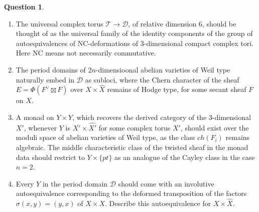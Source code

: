 \documentclass[12pt]{amsart}
\newcommand{\hide}[1]{}
\numberwithin{equation}{subsection}
\theoremstyle{plain}
\theoremstyle{definition}
\newtheorem{question}[thm]{Question}
\newcommand{\D}{{\mathcal D}}
\newcommand{\LB}{{\mathcal L}}
\newcommand{\T}{{\mathcal T}}
\renewcommand{\P}{{\mathcal P}}
\newcommand{\StructureSheaf}[1]{{\mathcal O}_{#1}}
\begin{document}
{\begin{question}
\begin{enumerate}
Algebraically, the fact that the pairing $(\bullet,\bullet)_V$ remains of Hodge type is encoded by the line bundle $\LB$ over $Y\times Y$, which is the pullback of the Poincar\'{e} line bundle over $Y\times \hat{Y}$ via the isomorphism $Y\cong \hat{Y}$ induced by $(\bullet,\bullet)_V.$
\item
The universal complex torus $\T\rightarrow \D$, of relative dimension $6$,  should be thought of as the universal family of the identity components of the group of autoequivalences of NC-deformations of $3$-dimensional compact complex tori. Here NC means not necessarily commutative.
\item
The period domains of $2n$-dimensioonal abelian varieties of Weil type naturally embed in $\D$ as subloci, where the Chern character of the sheaf $E=\Phi(F^\vee\boxtimes F)$ over $X\times \hat{X}$ remains of Hodge type, for some secant sheaf $F$ on $X$.
\item
A monad on $Y\times Y$, which recovers the derived category of the $3$-dimensional $X'$, whenever $Y$ is $X'\times\hat{X'}$ for some complex torus $X'$, should exist over the moduli space of abelian varieties of Weil type, as the class $ch(F_i)$ remains algebraic. 
The middle characteristic class of the twisted sheaf  in the monad data should restrict to $Y\times\{pt\}$ as an analogue of the Cayley class in the case $n=2$. 
\hide{
\item
For a general (non-commutative) formal deformation $X'$ of $X$ there should be an object $\StructureSheaf{\Delta_{X'}}$
in $D^b(X'\times X')$ which is the Fourier-Mukai kernel of the identity. So over a general gerby complex torus $Y$ in the period domain $\D$, there should be an object which is the image of $\StructureSheaf{\Delta_{X'}}$ via the equivalence $\Phi':D^b(X'\times X')\rightarrow D^b(Y)$ deforming Orlov's equivalence $\Phi:D^b(X\times X)\rightarrow D^b(X\times\hat{X})$.
ndeed, $\mu^*(\StructureSheaf{\Delta_{X}})\cong \mu^{-1}_*(\StructureSheaf{\Delta_{X}})$. Now $\mu^{-1}(\Delta_X)=\{0\}\times X$. So $\Phi(\StructureSheaf{\Delta_{X}})\cong \pi_1^*(\StructureSheaf{0})\boxtimes\Phi_{\P}^{-1}(\StructureSheaf{X})\cong
\StructureSheaf{0\times\hat{0}}[\pm n]$ is a shift of a sky-scraper sheaf of the origin of $X\times\hat{X}$.
}
\item
Every $Y$ in the period domain $\D$ should come with an involutive autoequivalence corresponding to the deformed transposition of the factors $\sigma(x,y)=(y,x)$ of $X\times X$. 
Describe this autoequivalence for $X\times\hat{X}$. 

\end{enumerate}
\end{question}}
\end{document}
